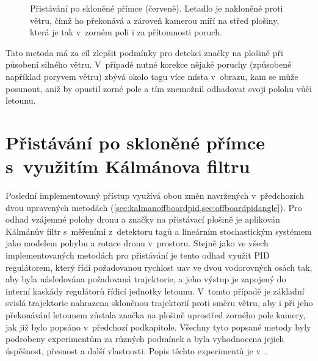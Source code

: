 \begin{figure}
            \caption[Přistávání po skloněné přímce]{Přistávání po skloněné přímce (červeně). Letadlo je nakloněné proti větru, čímž ho překonává a zároveň kamerou míří na střed plošiny, která je tak v~zorném poli i za přítomnosti poruch.}
            \label{fig:offboardpidangle}
        \end{figure}
        

        Tato metoda má za cíl zlepšit podmínky pro detekci značky na plošině při působení silného větru. V~případě nutné korekce nějaké poruchy (způsobené například poryvem větru) zbývá okolo tagu více místa v~obrazu, kam se může posunout, aniž by opustil zorné pole a tím znemožnil odhadovat svoji polohu vůči letounu.
    \section{Přistávání po skloněné přímce s~využitím Kálmánova filtru} \label{sec:kalmanoffboardpidangle}
        Poslední implementovaný přístup využívá obou změn navržených v~předchozích dvou upravených metodách (\cref{sec:kalmanoffboardpid,sec:offboardpidangle}). Pro odhad vzájemné polohy dronu a značky na přistávací plošině je aplikován Kálmánův filtr s~měřeními z~detektoru tagů a lineárním stochastickým systémem jako modelem pohybu a rotace dronu v~prostoru. Stejně jako ve všech implementovaných metodách pro přistávání je tento odhad využit PID regulátorem, který řídí požadovanou rychlost \acrshort{uav} ve dvou vodorovných osách tak, aby byla následována požadovaná trajektorie, a jeho výstup je zapojený do interní kaskády regulátorů řídicí jednotky letounu. V~tomto případě je základní svislá trajektorie nahrazena skloněnou trajektorií proti směru větru, aby i při jeho překonávání letounem zůstala značka na plošině uprostřed zorného pole kamery, jak již bylo popsáno v~předchozí podkapitole. Všechny tyto popsané metody byly podrobeny experimentům za různých podmínek a byla vyhodnocena jejich úspěšnost, přesnost a další vlastnosti. Popis těchto experimentů je v~.